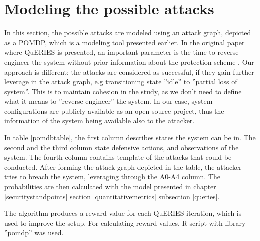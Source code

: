 \section{Modeling the possible attacks}

In this section, the possible attacks are modeled using an attack
graph, depicted as a POMDP, which is a modeling tool presented
earlier. In the original paper where QuERIES is presented, an
important parameter is the time to reverse-engineer the system without
prior information about the protection scheme
\cite{carin2008cybersecurity}. Our approach is different; the attacks
are considered as successful, if they gain further leverage in the
attack graph, e.g transitioning state ''idle'' to ''partial loss of
system''. This is to maintain cohesion in the study, as we don't need
to define what it means to ''reverse engineer'' the system. In our 
case, system configurations are publicly available as an open
source project, thus the information of the system being available
also to the attacker.

In table \ref{pomdbtable}, the first column describes states the
system can be in. The second and the third column state defensive
actions, and observations of the system. The fourth column contains
template of the attacks that could be conducted. After forming the
attack graph depicted in the table, the attacker tries to breach the
system, leveraging through the A0-A4 column. The probabilities are
then calculated with the model presented in chapter
\ref{securitystandpoints} section \ref{quantitativemetrics} subsection
\ref{queries}.

The algorithm produces a reward value for each QuERIES iteration,
which is used to improve the setup. For calculating reward values, R
script with library ''pomdp'' was used.

